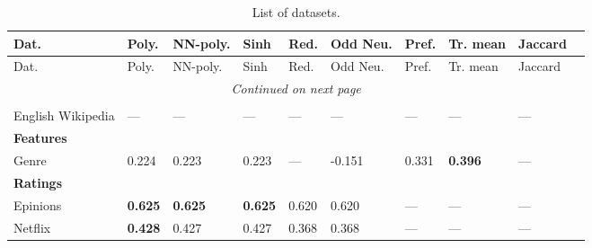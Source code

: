 
\begin{longtable}{ lllllllll }

\caption[List of datasets]{List of datasets.} \\

Dat.          & Poly. & NN-poly. & Sinh  & Red.  & Odd Neu. & Pref. & Tr. mean & Jaccard \ \\
\hline

\endfirsthead

Dat.          & Poly. & NN-poly. & Sinh  & Red.  & Odd Neu. & Pref. & Tr. mean & Jaccard \ \\
\hline

\endhead

\hline
\multicolumn{9}{c}{\textit{Continued on next page}} \\* 
\hline

\endfoot

\hline \hline
\endlastfoot


\hline
\multicolumn{9}{|l|}{\textbf{Authorship}} \\
\hline
English Wikipedia & --- & --- & --- & --- & --- & --- & --- & --- \\

\hline
\multicolumn{9}{|l|}{\textbf{Features}} \\
\hline
Genre           & 0.224 & 0.223 & 0.223 & --- & -0.151 & 0.331 & \bf{0.396} & --- \\

\hline
\multicolumn{9}{|l|}{\textbf{Ratings}} \\
\hline
Epinions        & \bf{0.625} & \bf{0.625} & \bf{0.625} & 0.620 & 0.620 & --- & --- & --- \\
Netflix         & \bf{0.428} & 0.427 & 0.427 & 0.368 & 0.368 & --- & --- & --- \\

      \hline
    \end{longtable} 

